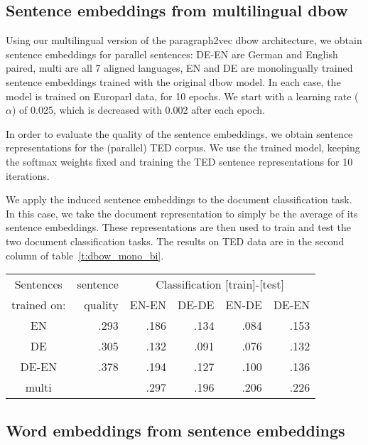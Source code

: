 \subsection{Sentence embeddings from multilingual dbow}
Using our multilingual version of the paragraph2vec dbow architecture, we obtain sentence embeddings for parallel sentences: DE-EN are German and English paired, multi are all 7 aligned languages, EN and DE are monolingually trained sentence embeddings trained with the original dbow model. In each case, the model is trained on Europarl data, for 10 epochs. We start with a learning rate ($\alpha$) of 0.025, which is decreased with 0.002 after each epoch.

 In order to evaluate the quality of the sentence embeddings, we obtain sentence representations for the (parallel) TED corpus. We use the trained model, keeping the softmax weights fixed and training the TED sentence representations for 10 iterations.

We apply the induced sentence embeddings to the document classification task. In this case, we take the document representation to simply be the average of its sentence embeddings. These representations are then used to train and test the two document classification tasks. The results on TED data are in the second column of table~\ref{t:dbow_mono_bi}.

\begin{table*}[t]
\center
\begin{tabular}{c | r|r r r r }
Sentences 		&sentence	&	\multicolumn{4}{c}{Classification [train]-[test]}	\\
trained on: 		&quality	&EN-EN	&DE-DE	&EN-DE	&DE-EN	\\\hline
EN			&.293		&.186		&.134		&.084		&.153		\\
DE			&.305		&.132		&.091		&.076		&.132		\\
DE-EN			&.378		&.194		&.127		&.100		&.136		\\
multi 			&		&.297		&.196		&.206		&.226		\\
\end{tabular}
\caption{F1 scores on TED classification task for sentence representations and word representations.}
\label{t:dbow_mono_bi}
\end{table*}



\subsection{Word embeddings from sentence embeddings}

